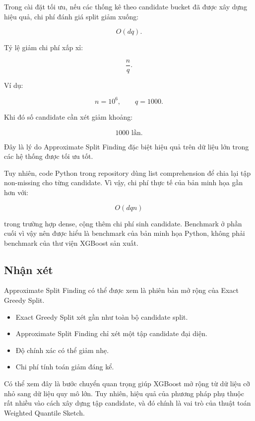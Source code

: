Trong cài đặt tối ưu, nếu các thống kê theo candidate bucket đã được xây dựng hiệu quả, chi phí đánh giá split giảm xuống:

\[
O(dq).
\]

Tỷ lệ giảm chi phí xấp xỉ:

\[
\frac{n}{q}.
\]

Ví dụ:

\[
n = 10^6,
\qquad
q = 1000.
\]

Khi đó số candidate cần xét giảm khoảng:

\[
1000 \text{ lần}.
\]

Đây là lý do Approximate Split Finding đặc biệt hiệu quả trên dữ liệu lớn trong các hệ thống được tối ưu tốt.

Tuy nhiên, code Python trong repository dùng list comprehension để chia lại tập non-missing cho từng candidate. Vì vậy, chi phí thực tế của bản minh họa gần hơn với:

\[
O(dqn)
\]

trong trường hợp dense, cộng thêm chi phí sinh candidate. Benchmark ở phần cuối vì vậy nên được hiểu là benchmark của bản minh họa Python, không phải benchmark của thư viện XGBoost sản xuất.

\subsection{Nhận xét}

Approximate Split Finding có thể được xem là phiên bản mở rộng của Exact Greedy Split.

\begin{itemize}
    \item Exact Greedy Split xét gần như toàn bộ candidate split.
    \item Approximate Split Finding chỉ xét một tập candidate đại diện.
    \item Độ chính xác có thể giảm nhẹ.
    \item Chi phí tính toán giảm đáng kể.
\end{itemize}

Có thể xem đây là bước chuyển quan trọng giúp XGBoost mở rộng từ dữ liệu cỡ nhỏ sang dữ liệu quy mô lớn. Tuy nhiên, hiệu quả của phương pháp phụ thuộc rất nhiều vào cách xây dựng tập candidate, và đó chính là vai trò của thuật toán Weighted Quantile Sketch.

